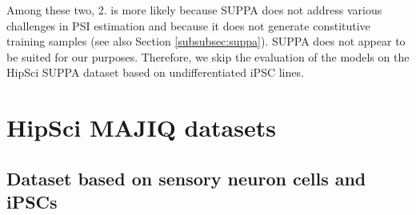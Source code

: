 Among these two, 2. is more likely because SUPPA does not address various challenges in PSI estimation and because it does not generate constitutive training samples (see also Section \ref{subsubsec:suppa}). SUPPA does not appear to be suited for our purposes. Therefore, we skip the evaluation of the models on the HipSci SUPPA dataset based on undifferentiated iPSC lines.





\section{HipSci MAJIQ datasets} \label{subsec:majiq}

\subsection{Dataset based on sensory neuron cells and iPSCs}\label{sec:hipsci_neuron_majiq}




